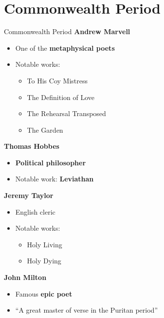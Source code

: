 \documentclass[
  12pt,
    progressbar=frametitle]{beamer}
\providecommand{\tightlist}{%
  \setlength{\itemsep}{0pt}\setlength{\parskip}{0pt}}
\begin{document}
\section{Commonwealth Period}
\begin{frame}[allowframebreaks]
{Commonwealth Period}
\large\textbf{Andrew Marvell}\normalsize\vspace{-3mm}

\begin{itemize}
\tightlist
\item
  One of the \textbf{metaphysical poets}
\item
  Notable works:

  \begin{itemize}
  \tightlist
  \item
    To His Coy Mistress
  \item
    The Definition of Love
  \item
    The Rehearsal Transposed
  \item
    The Garden
  \end{itemize}
\end{itemize}

\large\textbf{Thomas Hobbes}\normalsize\vspace{-3mm}

\begin{itemize}
\tightlist
\item
  \textbf{Political philosopher}
\item
  Notable work: \textbf{Leviathan}
\end{itemize}

\large\textbf{Jeremy Taylor}\normalsize\vspace{-3mm}

\begin{itemize}
\tightlist
\item
  English cleric
\item
  Notable works:

  \begin{itemize}
  \tightlist
  \item
    Holy Living
  \item
    Holy Dying
  \end{itemize}
\end{itemize}

\large\textbf{John Milton}\normalsize\vspace{-3mm}

\begin{itemize}
\tightlist
\item
  Famous \textbf{epic poet}
\item
  ``A great master of verse in the Puritan period''
\end{itemize}


\end{frame}
\end{document}
